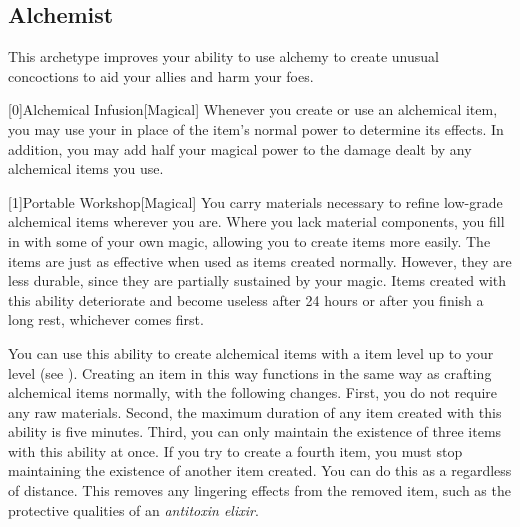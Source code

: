     \newpage
    \subsection{Alchemist}
        This archetype improves your ability to use alchemy to create unusual concoctions to aid your allies and harm your foes.

        [0]{Alchemical Infusion}[Magical] Whenever you create or use an alchemical item, you may use your   in place of the item's normal power to determine its effects.
        In addition, you may add half your magical power to the damage dealt by any alchemical items you use.

        [1]{Portable Workshop}[Magical]
        You carry materials necessary to refine low-grade alchemical items wherever you are.
        Where you lack material components, you fill in with some of your own magic, allowing you to create items more easily.
        The items are just as effective when used as items created normally.
        However, they are less durable, since they are partially sustained by your magic.
        Items created with this ability deteriorate and become useless after 24 hours or after you finish a long rest, whichever comes first.

        You can use this ability to create alchemical items with a item level up to your level (see ).
        Creating an item in this way functions in the same way as crafting alchemical items normally, with the following changes.
        First, you do not require any raw materials.
        Second, the maximum duration of any item created with this ability is five minutes.
        Third, you can only maintain the existence of three items with this ability at once.
        If you try to create a fourth item, you must stop maintaining the existence of another item created.
        You can do this as a  regardless of distance.
        This removes any lingering effects from the removed item, such as the protective qualities of an \textit{antitoxin elixir}.

